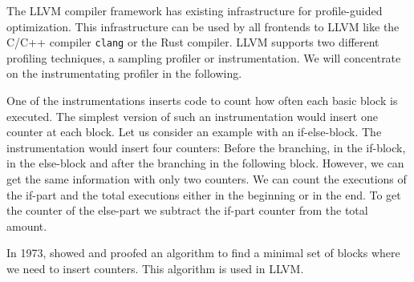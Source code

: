 \clearpage
{}
The LLVM compiler framework has existing infrastructure for profile-guided optimization. This infrastructure can be used by all frontends to LLVM like the C/C++ compiler \texttt{clang} or the Rust compiler. LLVM supports two different profiling techniques, a sampling profiler or instrumentation. We will concentrate on the instrumentating profiler in the following.

One of the instrumentations inserts code to count how often each basic block is executed. The simplest version of such an instrumentation would insert one counter at each block. Let us consider an example with an if-else-block. The instrumentation would insert four counters: Before the branching, in the if-block, in the else-block and after the branching in the following block. However, we can get the same information with only two counters. We can count the executions of the if-part and the total executions either in the beginning or in the end. To get the counter of the else-part we subtract the if-part counter from the total amount.

In 1973, \citet{Knuth1973} showed and proofed an algorithm to find a minimal set of blocks where we need to insert counters. This algorithm is used in LLVM.